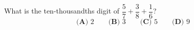 What is the ten-thousandths digit of $\dfrac{5}{7}+\dfrac{3}{8}+\dfrac{1}{6}$?
\[
\textbf{(A) }2\qquad\textbf{(B) }3\qquad\textbf{(C) }5\qquad\textbf{(D) }9
\]
